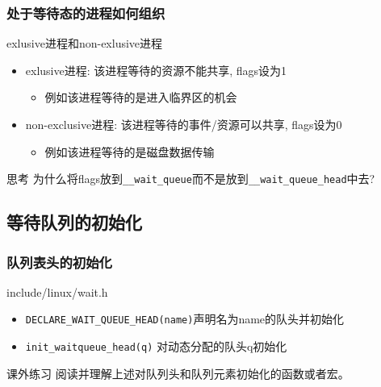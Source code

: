 \documentclass[xcolor=svgnames]{beamer}
\begin{document}
\begin{CJK*}{UTF8}{gbsn}
\begin{frame}[fragile]
\frametitle{处于等待态的进程如何组织}
\begin{block}{exlusive进程和non-exlusive进程}
\begin{itemize}
\item exlusive进程: 该进程等待的资源不能共享, flags设为1
\begin{itemize}
\item 例如该进程等待的是进入临界区的机会
\end{itemize}
\item non-exclusive进程: 该进程等待的事件/资源可以共享, flags设为0
\begin{itemize}
\item 例如该进程等待的是磁盘数据传输
\end{itemize}
\end{itemize}
\end{block}
\begin{block}{思考}
为什么将flags放到\verb|__wait_queue|而不是放到\verb|__wait_queue_head|中去?
\end{block}
\end{frame}

\subsection{等待队列的初始化}

\begin{frame}[fragile]
\frametitle{队列表头的初始化}
\begin{block}{include/linux/wait.h}
\begin{itemize}
\item \verb|DECLARE_WAIT_QUEUE_HEAD(name)|声明名为name的队头并初始化
\item \verb|init_waitqueue_head(q)| 对动态分配的队头q初始化
\end{itemize}
\end{block}
\begin{block}{课外练习}
阅读并理解上述对队列头和队列元素初始化的函数或者宏。
\end{block}
\end{frame}


\end{CJK*}
\end{document}
